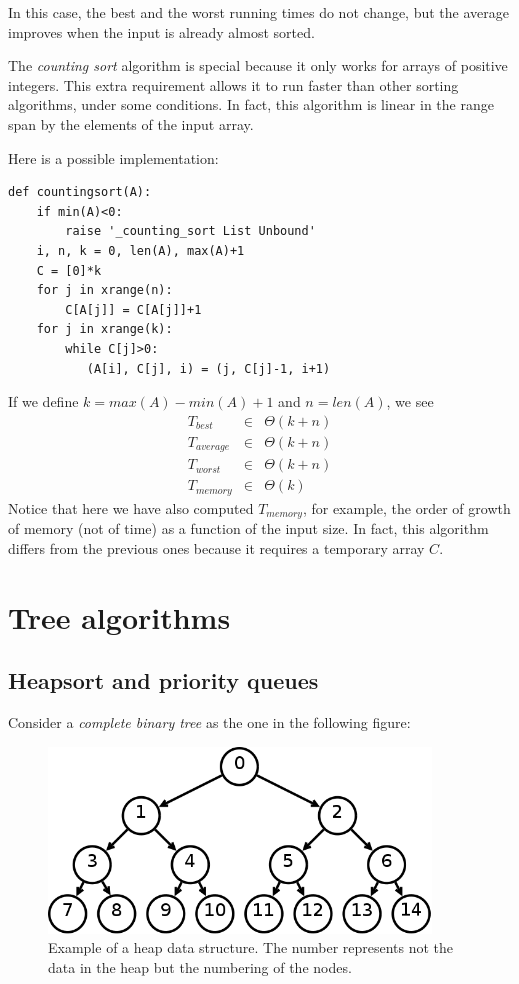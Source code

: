 \documentclass[justified,sixbynine]{tufte-book}
\theoremstyle{plain}%
\theoremstyle{definition}
\theoremstyle{remark}
\begin{document}
\begin{fullwidth}
In this case, the best and the worst running times do not change, but the average improves when the input is already almost sorted.


The {\it counting sort} algorithm is special because it only works for arrays of positive integers. This extra requirement allows it to run faster than other sorting algorithms, under some conditions. In fact, this algorithm is linear in the range span by the elements of the input array.

Here is a possible implementation:
\begin{lstlisting}
def countingsort(A):
    if min(A)<0:
        raise '_counting_sort List Unbound'
    i, n, k = 0, len(A), max(A)+1
    C = [0]*k
    for j in xrange(n):
        C[A[j]] = C[A[j]]+1
    for j in xrange(k):
        while C[j]>0:
           (A[i], C[j], i) = (j, C[j]-1, i+1)
\end{lstlisting}

If we define $k=max(A)-min(A)+1$ and $n=len(A)$, we see
\begin{eqnarray}
T_{best} &\in &\Theta (k+n) \\
T_{average} &\in &\Theta (k+n) \\
T_{worst} &\in &\Theta (k+n) \\
T_{memory} &\in &\Theta (k)
\end{eqnarray}
Notice that here we have also computed $T_{memory}$, for example, the order of growth of memory (not of time) as a function of the input size. In fact, this algorithm differs from the previous ones because it requires a temporary array $C$.

\goodbreak\section{Tree algorithms}


\goodbreak\subsection{Heapsort and priority queues}


Consider a {\it complete binary tree} as the one in the following figure:

\begin{figure}[ht]
\centering\includegraphics[width=4in]{images/heap.png}
\caption{Example of a heap data structure. The number represents not the data in the heap but the numbering of the nodes.}
\end{figure}


\end{fullwidth}
\end{document}
